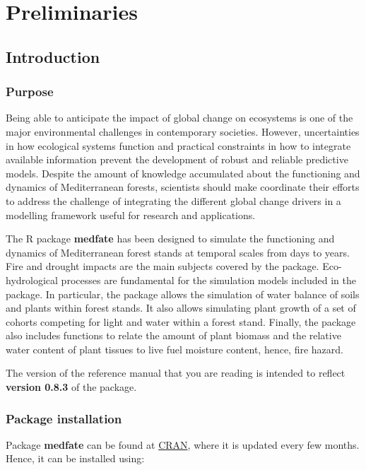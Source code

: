 \documentclass[]{book}
\begin{document}
\part{Preliminaries}\label{part-preliminaries}

\chapter{Introduction}\label{intro}

\section{Purpose}\label{purpose}

Being able to anticipate the impact of global change on ecosystems is
one of the major environmental challenges in contemporary societies.
However, uncertainties in how ecological systems function and practical
constraints in how to integrate available information prevent the
development of robust and reliable predictive models. Despite the amount
of knowledge accumulated about the functioning and dynamics of
Mediterranean forests, scientists should make coordinate their efforts
to address the challenge of integrating the different global change
drivers in a modelling framework useful for research and applications.

The R package \textbf{medfate} has been designed to simulate the
functioning and dynamics of Mediterranean forest stands at temporal
scales from days to years. Fire and drought impacts are the main
subjects covered by the package. Eco-hydrological processes are
fundamental for the simulation models included in the package. In
particular, the package allows the simulation of water balance of soils
and plants within forest stands. It also allows simulating plant growth
of a set of cohorts competing for light and water within a forest stand.
Finally, the package also includes functions to relate the amount of
plant biomass and the relative water content of plant tissues to live
fuel moisture content, hence, fire hazard.

The version of the reference manual that you are reading is intended to
reflect \textbf{version 0.8.3} of the package.

\section{Package installation}\label{package-installation}

Package \textbf{medfate} can be found at
\href{https://CRAN.R-project.org/package=medfate}{CRAN}, where it is
updated every few months. Hence, it can be installed using:
\end{document}
